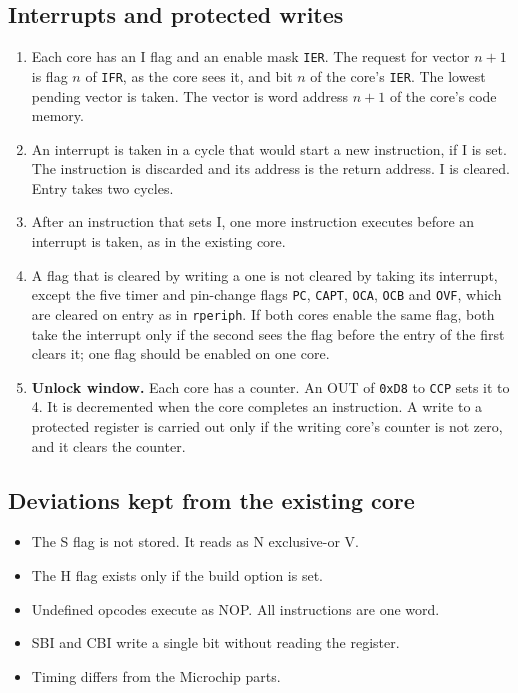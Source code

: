 \documentclass[10pt,a4paper]{article}
\newcommand{\reg}[1]{\texttt{#1}}
\begin{document}
\subsection{Interrupts and protected writes}

\begin{enumerate}[label=\textbf{Q\arabic*},leftmargin=2.6em]
\item Each core has an I flag and an enable mask \reg{IER}. The request for vector $n+1$ is flag $n$ of
\reg{IFR}, as the core sees it, and bit $n$ of the core's \reg{IER}. The lowest pending vector is taken. The
vector is word address $n+1$ of the core's code memory.
\item An interrupt is taken in a cycle that would start a new instruction, if I is set. The instruction is
discarded and its address is the return address. I is cleared. Entry takes two cycles.
\item After an instruction that sets I, one more instruction executes before an interrupt is taken, as in the
existing core.
\item A flag that is cleared by writing a one is not cleared by taking its interrupt, except the five timer and
pin-change flags \reg{PC}, \reg{CAPT}, \reg{OCA}, \reg{OCB} and \reg{OVF}, which are cleared on entry as in
\texttt{rperiph}. If both cores enable the same flag, both take the interrupt only if the second sees the flag
before the entry of the first clears it; one flag should be enabled on one core.
\item \textbf{Unlock window.} Each core has a counter. An OUT of \texttt{0xD8} to \reg{CCP} sets it to 4. It is
decremented when the core completes an instruction. A write to a protected register is carried out only if
the writing core's counter is not zero, and it clears the counter.
\end{enumerate}

\subsection{Deviations kept from the existing core}

\begin{itemize}
\item The S flag is not stored. It reads as N exclusive-or V.
\item The H flag exists only if the build option is set.
\item Undefined opcodes execute as NOP. All instructions are one word.
\item SBI and CBI write a single bit without reading the register.
\item Timing differs from the Microchip parts.
\end{itemize}
\end{document}
